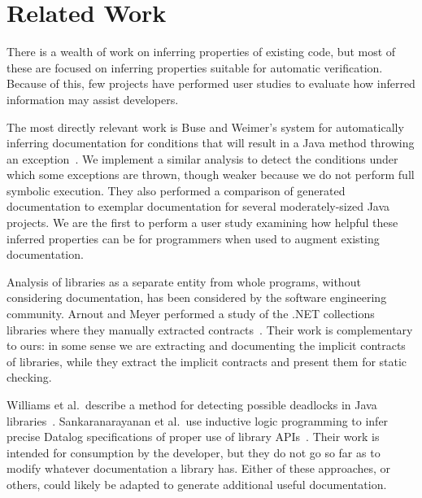 \section{Related Work}
There is a wealth of work on inferring properties of existing code,
but most of these are focused on inferring properties suitable for automatic
verification.
Because of this, few projects have performed user studies to evaluate how
inferred information may assist developers.

The most directly relevant work is Buse and Weimer's system for automatically
inferring documentation for conditions that will result in a Java method
throwing an exception~\cite{autodoc}.  We implement a similar analysis
to detect the conditions under which some exceptions are thrown, though weaker
because we do not perform full symbolic execution.  They also performed a
comparison of generated documentation to exemplar documentation for several
moderately-sized Java projects.  We are the first to perform a user study
examining how
helpful these inferred properties can be for programmers when used to augment existing
documentation.

Analysis of libraries as a separate entity from whole programs, without
considering documentation, has been considered by the software
engineering community.  Arnout and Meyer performed a study of the .NET
collections libraries where they manually extracted
contracts~\cite{findingcontracts}.  Their work is complementary to ours: in some
sense we are extracting and documenting the implicit contracts of libraries,
while they extract the implicit contracts and present them for static checking.

Williams et al.~describe a method for detecting possible deadlocks in Java
libraries~\cite{deadlocklibs}.  Sankaranarayanan et al.~use inductive logic
programming to infer precise Datalog specifications of proper use of library
APIs~\cite{mininglibspecs}.  Their work is intended for consumption by the
developer, but they do not go so far as to modify whatever documentation a
library has.  Either of these approaches, or others, could likely be adapted to
generate additional useful documentation.

